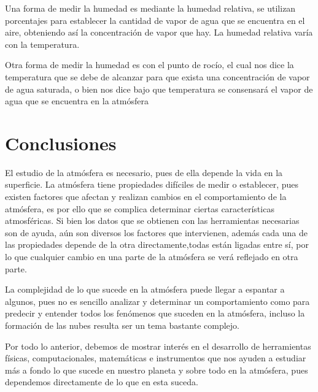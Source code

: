 \documentclass[12pt]{article}
\begin{document}
\begin{itemize}
Una forma de medir la humedad es mediante la humedad relativa, se utilizan porcentajes para establecer la cantidad de vapor de agua que se encuentra en el aire, obteniendo así la concentración de vapor que hay. La humedad relativa varía con la temperatura.

Otra forma de medir la humedad es con el punto de rocío, el cual nos dice la temperatura que se debe de alcanzar para que exista una concentración de vapor de agua saturada, o bien nos dice bajo que temperatura se consensará el vapor de agua que se encuentra en la atmósfera \cite{moist}
\end{itemize}
    
\newpage
\section{Conclusiones}
El estudio de la atmósfera es necesario, pues de ella depende la vida en la superficie. La atmósfera tiene propiedades difíciles de medir o establecer, pues existen factores que afectan y realizan cambios en el comportamiento de la atmósfera, es por ello que se complica determinar ciertas características atmosféricas. Si bien los datos que se obtienen con las herramientas necesarias son de ayuda, aún son diversos los factores que intervienen, además cada una de las propiedades depende de la otra directamente,todas están ligadas entre sí, por lo que cualquier cambio en una parte de la atmósfera se verá reflejado en otra parte.

La complejidad de lo que sucede en la atmósfera puede llegar a espantar a algunos, pues no es sencillo analizar y determinar un comportamiento como para predecir y entender todos los fenómenos que suceden en la atmósfera, incluso la formación de las nubes resulta ser un tema bastante complejo. 

Por todo lo anterior, debemos de mostrar interés en el desarrollo de herramientas físicas, computacionales, matemáticas e instrumentos que nos ayuden a estudiar más a fondo lo que sucede en nuestro planeta y sobre todo en la atmósfera, pues dependemos directamente de lo que en esta suceda.
    
\end{document}
